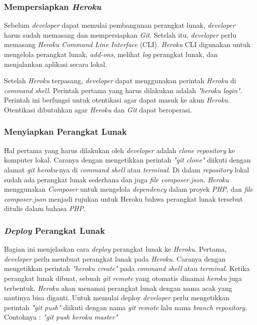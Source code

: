 \subsubsection{Mempersiapkan \textit{Heroku}}
Sebelum \textit{developer} dapat memulai pembangunan perangkat lunak, \textit{developer} harus sudah memasang dan mempersiapkan \textit{Git}. Setelah itu, \textit{developer} perlu memasang \textit{Heroku Command Line Interface} (CLI). \textit{Heroku} CLI digunakan untuk mengelola perangkat lunak, \textit{add-ons}, melihat \textit{log} perangkat lunak, dan menjalankan aplikasi secara lokal.\footnotemark[\value{footnote}]

Setelah \textit{Heroku} terpasang, \textit{developer} dapat menggunakan perintah \textit{Heroku} di \textit{command shell}. Perintah pertama yang harus dilakukan adalah \textit{"heroku login"}. Perintah ini berfungsi untuk otentikasi agar dapat masuk ke akun \textit{Heroku}. Otentikasi dibutuhkan agar \textit{Heroku} dan \textit{Git} dapat beroperasi. \footnotemark[\value{footnote}]

\subsubsection{Menyiapkan Perangkat Lunak}
Hal pertama yang harus dilakukan oleh \textit{developer} adalah \textit{clone} \textit{repository} ke komputer lokal. Caranya dengan mengetikkan perintah \textit{"git clone"} diikuti dengan alamat \textit{git heroku}-nya di \textit{command shell} atau \textit{terminal}. Di dalam \textit{repository} lokal sudah ada perangkat lunak sederhana dan juga \textit{file composer.json}. \textit{Heroku} menggunakan \textit{Composer} untuk mengelola \textit{dependency} dalam proyek \textit{PHP}, dan \textit{file composer.json} menjadi rujukan untuk Heroku bahwa perangkat lunak tersebut ditulis dalam bahasa \textit{PHP}. \footnotemark[\value{footnote}]

\subsubsection{\textit{Deploy} Perangkat Lunak}
Bagian ini menjelaskan cara \textit{deploy} perangkat lunak ke \textit{Heroku}. Pertama, \textit{developer} perlu membuat perangkat lunak pada \textit{Heroku}. Caranya dengan mengetikkan perintah \textit{"heroku create"} pada \textit{command shell} atau \textit{terminal}. Ketika perangkat lunak dibuat, sebuah \textit{git remote} yang otomatis dinamai \textit{heroku} juga terbentuk. \textit{Heroku} akan menamai perangkat lunak dengan nama acak yang nantinya bisa diganti. Untuk memulai deploy \textit{developer} perlu mengetikkan perintah \textit{"git push"} diikuti dengan nama \textit{git remote} lalu nama \textit{branch repository}. Contohnya : \textit{"git push heroku master"} \footnotemark[\value{footnote}]

